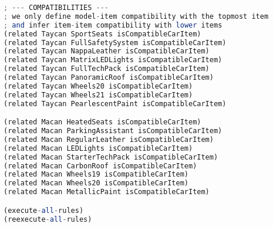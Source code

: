 \documentclass[a4paper,12pt]{report}
\begin{document}
\begin{lstlisting}[language=Octave]
; --- COMPATIBILITIES ---
; we only define model-item compatibility with the topmost item
; and infer item-item compatibility with lower items
(related Taycan SportSeats isCompatibleCarItem)
(related Taycan FullSafetySystem isCompatibleCarItem)
(related Taycan NappaLeather isCompatibleCarItem)
(related Taycan MatrixLEDLights isCompatibleCarItem)
(related Taycan FullTechPack isCompatibleCarItem)
(related Taycan PanoramicRoof isCompatibleCarItem)
(related Taycan Wheels20 isCompatibleCarItem)
(related Taycan Wheels21 isCompatibleCarItem)
(related Taycan PearlescentPaint isCompatibleCarItem)

(related Macan HeatedSeats isCompatibleCarItem)
(related Macan ParkingAssistant isCompatibleCarItem)
(related Macan RegularLeather isCompatibleCarItem)
(related Macan LEDLights isCompatibleCarItem)
(related Macan StarterTechPack isCompatibleCarItem)
(related Macan CarbonRoof isCompatibleCarItem)
(related Macan Wheels19 isCompatibleCarItem)
(related Macan Wheels20 isCompatibleCarItem)
(related Macan MetallicPaint isCompatibleCarItem)

(execute-all-rules)
(reexecute-all-rules)


\end{lstlisting}
\end{document}
